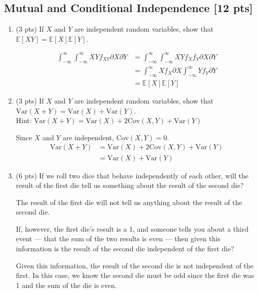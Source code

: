\documentclass[a4paper]{article}
\theoremstyle{definition}
\newcommand{\Var}{\mathrm{Var}}
\newcommand{\Cov}{\mathrm{Cov}}
\newenvironment{soln}{
	\leavevmode\color{blue}\ignorespaces
}{}
\begin{document}
	\subsection{Mutual and Conditional Independence [12 pts]}
	\begin{enumerate}
		\item (3 pts) If $X$ and $Y$ are independent random variables, show that
		$\mathbb{E}[XY] = \mathbb{E}[X]\mathbb{E}[Y]$.
		
		\begin{soln}
			$$
			\begin{aligned}
				\int_{-\infty}^{\infty} \int_{-\infty}^{\infty} XYf_{XY}\partial X \partial Y & = \int_{-\infty}^{\infty} \int_{-\infty}^{\infty} XYf_{X}f_{Y}\partial X \partial Y\\
				& = \int_{-\infty}^{\infty} Xf_{X} \partial X \int_{-\infty}^{\infty} Yf_{Y} \partial Y\\
				& = \mathbb{E}[X] \mathbb{E}[Y]
			\end{aligned}
			$$
		\end{soln}
		
		\item (3 pts) If $X$ and $Y$ are independent random variables, show that
		$\Var(X+Y) = \Var(X) + \Var(Y)$. \\
		Hint: $\Var(X+Y) = \Var(X) + 2\Cov(X, Y) + \Var(Y)$
		
		\begin{soln} 
			Since $X$ and $Y$ are independent, $\Cov(X, Y) = 0$.
			$$
			\begin{aligned}
				\Var(X+Y) & = \Var(X) + 2\Cov(X, Y) + \Var(Y)\\
				& = \Var(X) + \Var(Y)
			\end{aligned}
			$$ 
		\end{soln}
		
		\item (6 pts) If we roll two dice that behave independently of each
		other, will the result of the first die tell us something about the
		result of the second die? 
		
		\begin{soln}  The result of the first die will not tell us anything about the result of the second die. \end{soln}
		
		If, however, the first die's result is a 1,
		and someone tells you about a third event --- that the sum of the two
		results is even --- then given this information is the result of the second die
		independent of the first die? 
		
		\begin{soln}  Given this information, the result of the second die is not independent of the first. In this case, we know the second die must be odd since the first die was 1 and the sum of the die is even. \end{soln}
	\end{enumerate}
	
\end{document}
